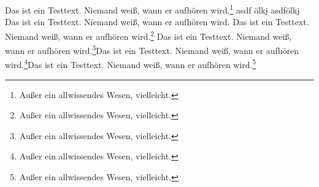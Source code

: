 \documentclass{article}
\begin{document}
Das ist ein Testtext. Niemand weiß, wann er aufhören wird.\footnote{Außer ein allwissendes Wesen, vielleicht.} asdf ölkj asdfölkj
Das ist ein Testtext. Niemand weiß, wann er aufhören wird.\newpage
Das ist ein Testtext. Niemand weiß, wann er aufhören wird.\footnote{Außer ein allwissendes Wesen, vielleicht.}
Das ist ein Testtext. Niemand weiß, wann er aufhören wird.\footnote{Außer ein allwissendes Wesen, vielleicht.}Das ist ein Testtext. Niemand weiß, wann er aufhören wird.\footnote{Außer ein allwissendes Wesen, vielleicht.}Das ist ein Testtext. Niemand weiß, wann er aufhören wird.\footnote{Außer ein allwissendes Wesen, vielleicht.}
\end{document}
